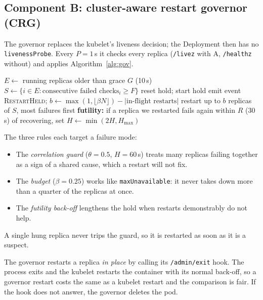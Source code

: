 \documentclass[conference]{IEEEtran}
\begin{document}
\subsection{Component B: cluster-aware restart governor (CRG)}
The governor replaces the kubelet's liveness decision; the Deployment
then has no \texttt{livenessProbe}. Every $P{=}1$\,s it checks every
replica (\texttt{/livez} with A, \texttt{/healthz} without) and applies
Algorithm~\ref{alg:gov}.

\begin{algorithm}[t]
\caption{One governor tick}
\label{alg:gov}
\footnotesize
\begin{algorithmic}[1]
\State $E \gets$ running replicas older than grace $G$ (10\,s)
\State $S \gets \{i\in E : \text{consecutive failed checks}_i \ge F\}$
 \State reset hold; \Return \EndIf
{} 
   start hold \EndIf
   \State emit event \textsc{RestartHeld}; \Return \EndIf
\EndIf
\State $b \gets \max(1,\lfloor \beta N\rfloor) - |\text{in-flight restarts}|$
\State restart up to $b$ replicas of $S$, most failures first
\State \textbf{futility:} if a replica we restarted fails again within
       $R$ (30\,s) of recovering, set $H \gets \min(2H, H_{\max})$
\end{algorithmic}
\end{algorithm}

The three rules each target a failure mode:
\begin{itemize}
\item The \emph{correlation guard} ($\theta{=}0.5$, $H{=}60$\,s) treats
  many replicas failing together as a sign of a shared cause, which a
  restart will not fix.
\item The \emph{budget} ($\beta{=}0.25$) works like
  \texttt{maxUnavailable}: it never takes down more than a quarter of
  the replicas at once.
\item The \emph{futility back-off} lengthens the hold when restarts
  demonstrably do not help.
\end{itemize}
A single hung replica never trips the guard, so it is restarted as soon
as it is a suspect.

The governor restarts a replica \emph{in place} by calling its
\texttt{/admin/exit} hook. The process exits and the kubelet restarts
the container with its normal back-off, so a governor restart costs the
same as a kubelet restart and the comparison is fair. If the hook does
not answer, the governor deletes the pod.
\end{document}
